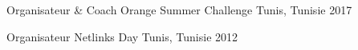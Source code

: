 

\begin{cvhonors}

	\cvhonor
		{Organisateur \& Coach} %
		{Orange Summer Challenge} %
		{Tunis, Tunisie} %
		{2017} %

  \cvhonor
    {Organisateur} %
    {Netlinks Day} %
    {Tunis, Tunisie} %
    {2012} %

\end{cvhonors}
